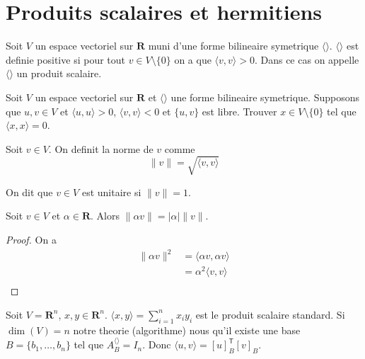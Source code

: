 
\chapter{Produits scalaires et hermitiens}

\begin{definition}
Soit $V$ un espace vectoriel sur $\mathbf{R}$ muni d'une forme bilineaire symetrique $\langle  \rangle$. $\langle  \rangle$ est definie positive si pour tout $v\in V\setminus \{ 0 \}$ on a que $\langle v,v \rangle>0$. Dans ce cas on appelle $\langle  \rangle$ un produit scalaire.
\end{definition}
\begin{exercise}
Soit $V$ un espace vectoriel sur $\mathbf{R}$ et $\langle  \rangle$ une forme bilineaire symetrique. Supposons que $u,v\in V$ et $\langle u,u \rangle>0$, $\langle v,v \rangle<0$ et $\{ u,v \}$ est libre. Trouver $x \in V\setminus \{ 0 \}$ tel que $\langle x,x \rangle=0$. 
\end{exercise}
\begin{definition}[Norme]
Soit $v\in V$. On definit la norme de $v$ comme 
$$
\lVert v \rVert =\sqrt{ \langle v,v \rangle  }
$$
\end{definition}
\begin{definition}
On dit que $v\in V$ est unitaire si $\lVert v \rVert=1$.
\end{definition}
\begin{proposition}
Soit $v\in V$ et $\alpha \in \mathbf{R}$. Alors $\lVert \alpha v \rVert=|\alpha|\lVert v \rVert$.
\end{proposition}
\begin{proof}
On a 
\begin{align*}
\lVert \alpha v \rVert^{2} & =\langle \alpha v,\alpha v \rangle \\
 & =\alpha^{2}\langle v,v \rangle \\
\end{align*}
\end{proof}
\begin{example}
Soit $V=\mathbf{R}^{n}$, $x,y\in \mathbf{R}^{n}$. $\langle x,y \rangle=\sum_{i=1}^{n}x_{i}y_{i}$ est le produit scalaire standard. Si $\dim(V)=n$ notre theorie (algorithme) nous qu'il existe une base $B=\{ b_{1},\dots,b_{n} \}$ tel que $A_{B}^{\langle  \rangle}=I_{n}$. Donc $\langle u,v \rangle=[u]_{B}^{\mathsf{T}}[v]_{B}$.
\end{example}

